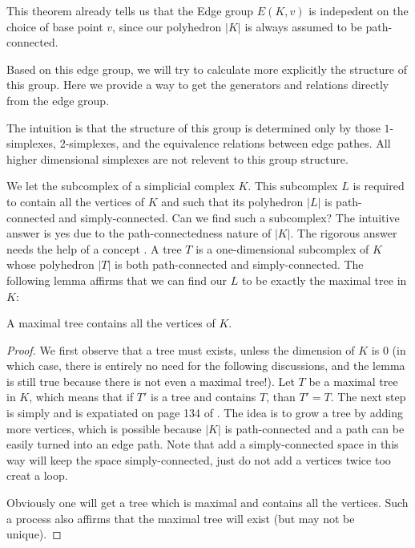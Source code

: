 \begin{remark}
    This theorem already tells us that the Edge group $E(K,v)$ is
    indepedent on the choice of base point $v$, since our polyhedron
    $|K|$ is always assumed to be path-connected.
\end{remark}

Based on this edge group, we will try to calculate more explicitly the
structure of this group. Here we provide a way to get the generators
and relations directly from the edge group.

\begin{key}
    The intuition is that the structure of this group is
    determined only by those $1$-simplexes, $2$-simplexes, and the
    equivalence relations between edge pathes. All higher dimensional
    simplexes are not relevent to this group structure.
\end{key}

We let  the subcomplex of a simplicial complex $K$. This
subcomplex $L$ is required to contain all the vertices of $K$ and such
that its polyhedron $|L|$ is path-connected and simply-connected. Can
we find such a subcomplex? The intuitive answer is yes due to the
path-connectedness nature of $|K|$. The rigorous answer needs the help
of a concept . A tree $T$ is a one-dimensional subcomplex of
$K$ whose polyhedron $|T|$ is both path-connected and
simply-connected. The following lemma affirms that we can find our $L$
to be exactly the maximal tree in $K$:
\begin{lemma}
    A maximal tree contains all the vertices of $K$.
\end{lemma}
\begin{proof}
    We first observe that a tree must exists, unless the dimension of
    $K$ is $0$ (in which case, there is entirely no need for the
    following discussions, and the lemma is still true because there is
    not even a maximal tree!). Let $T$ be a maximal tree in $K$, which
    means that if $T'$ is a tree and contains $T$, than $T'=T$. 
    The next step is simply and is expatiated on page 134 of
    \cite{book}. The idea is to grow a tree by adding more vertices,
    which is possible because $|K|$ is path-connected and a path can
    be easily turned into an edge path. Note that add a
    simply-connected space in this way will keep the space
    simply-connected, just do not add a vertices twice too creat a
    loop. 
    
    Obviously one will get a tree which is maximal and contains all
    the vertices.  Such a process also affirms that the maximal tree
    will exist (but may not be unique).
\end{proof}

